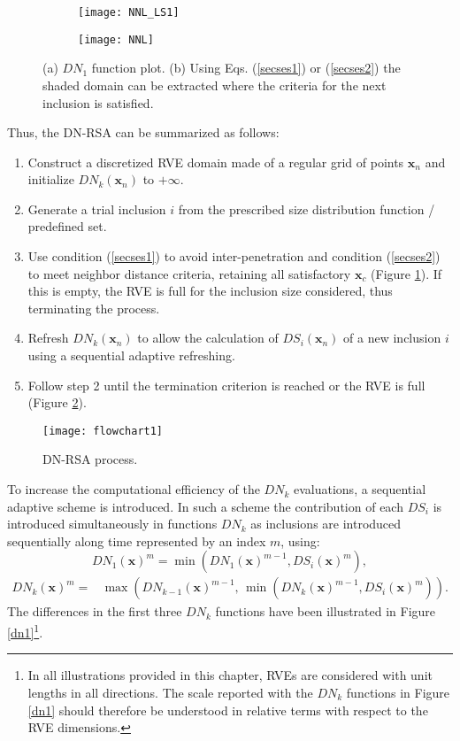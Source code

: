 \begin{figure}
	\centering
	\begin{subfigure}[t]{0.37\textwidth}
		\texttt{[image: NNL\_LS1]}	
		\caption{}
	\end{subfigure}
	\begin{subfigure}[t]{0.33\textwidth}
		\texttt{[image: NNL]}	
		\caption{}
	\end{subfigure}
	\caption{(a) $DN_1$ function plot. (b) Using Eqs. (\ref{secses1}) or (\ref{secses2}) the shaded domain can be extracted where the criteria for the next inclusion is satisfied. }\label{rsa_rsa}
\end{figure}

Thus, the DN-RSA can be summarized as follows:
\begin{enumerate}
	\item Construct a discretized RVE domain made of a regular grid of points $ \textbf{x}_n $ and initialize $ DN_k(\textbf{x}_n) $ to $ +\infty $.
	\item Generate a trial inclusion $ i $ from the prescribed size distribution function / predefined set.
	\item Use condition (\ref{secses1}) to avoid inter-penetration and condition (\ref{secses2}) to  meet neighbor distance criteria, retaining all satisfactory $ \textbf{x}_c $ (Figure \ref{rsa_rsa}). If this is empty, the RVE is full for the inclusion size considered, thus terminating the process.
	\item Refresh $ DN_k(\textbf{x}_n) $ to allow the calculation of $ DS_i(\textbf{x}_n) $ of a new inclusion $ i $ using a sequential adaptive refreshing.
	\item Follow step 2 until the termination criterion is reached or the RVE is full (Figure \ref{dn-rsa}).
\end{enumerate}
\begin{figure}
	\centering
	\texttt{[image: flowchart1]}
	\caption{DN-RSA process.}\label{dn-rsa}
\end{figure}
To increase the computational efficiency of the $ DN_k $ evaluations, a sequential adaptive scheme is introduced. {In such a scheme the contribution of each $ DS_i $ is introduced simultaneously in functions $ DN_k $ as inclusions are introduced sequentially along time represented by an index $ m $}, using:
\begin{equation}
DN_1(\textbf{x})^m=\min(DN_1(\textbf{x})^{m-1},DS_i(\textbf{x})^m),
\end{equation}
\begin{equation}
\begin{split}
DN_k(\textbf{x})^m=&\max\left(DN_{k-1}(\textbf{x})^{m-1},\,\min(DN_k(\textbf{x})^{m-1},DS_i(\textbf{x})^m)\right).
\end{split}
\end{equation}
The differences in the first three $ DN_k $ functions have been illustrated in Figure \ref{dn1}\footnote{In all illustrations provided in this chapter, RVEs are considered with unit lengths in all directions. The scale reported with the $ DN_k $ functions in Figure \ref{dn1} should therefore be understood in relative terms with respect to the RVE dimensions.}.

